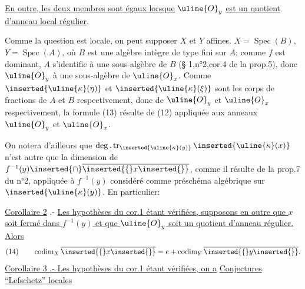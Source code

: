 \uline{En outre, les deux membres sont égaux lorsque} $\uline{O}_y$ \uline{est un quotient d'anneau local régulier}.

Comme la question est locale, on peut supposer $X$ et $Y$ affines.  $X=\operatorname{Spec}(B)$, $Y=\operatorname{Spec}(A)$, où $B$ est une algèbre intègre de type fini sur $A$; comme $f$ est dominant, $A$ s'identifie à une sous-algèbre de $B$ (§ 1,n°2,cor.4 de la prop.5), donc $\uline{O}_y$ à une sous-algèbre de $\uline{O}_x$. Comme $\inserted{\uline{\kappa}(\eta)}$ et $\inserted{\uline{\kappa}(\xi)}$ sont les corps de fractions de $A$ et $B$ respectivement, donc de  $\uline{O}_y$ et $\uline{O}_x$ respectivement, la formule (13) résulte de (12) appliquée aux anneaux $\uline{O}_y$ et $\uline{O}_x$.

On notera d'ailleurs que $\deg.\operatorname{tr}_{\inserted{\uline{\kappa}(y)}}\inserted{\uline{\kappa}(x)}$ n'est autre que la dimension de $f^{-1}(y)\inserted{\cap}\overline{\inserted{\{}x\inserted{\}}}$, comme il résulte de la prop.7 du n°2, appliquée à $f^{-1}(y)$ considéré comme préschéma algébrique sur $\inserted{\uline{\kappa}(y)}$. En particulier:

\uline{Corollaire 2} .-  \uline{Les hypothèses du cor.1 étant vérifiées, supposons en outre que $x$ soit fermé dans $f^{-1}(y)$ et que $\uline{O}_y$ soit un quotient d'anneau régulier. Alors}
\[
(14)\qquad\operatorname{codim}_X\overline{\inserted{\{}x\inserted{\}}}=e+\operatorname{codim}_Y\overline{\inserted{\{}y\inserted{\}}}.
\]
\uline{Corollaire 3 .- Les hypothèses du cor.1 étant vérifiées, on a}
\uline{Conjectures ``Lefschetz'' locales}

